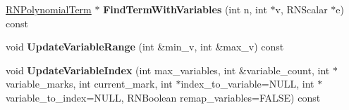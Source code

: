 \begin{DoxyCompactItemize}
\item 
\hyperlink{class_r_n_polynomial_term}{R\+N\+Polynomial\+Term} $\ast$ {\bfseries Find\+Term\+With\+Variables} (int n, int $\ast$v, R\+N\+Scalar $\ast$e) const \hypertarget{class_r_n_polynomial_ab54b0c8ee80c040a4acfb7a6e0633d56}{}\label{class_r_n_polynomial_ab54b0c8ee80c040a4acfb7a6e0633d56}

\item 
void {\bfseries Update\+Variable\+Range} (int \&min\+\_\+v, int \&max\+\_\+v) const \hypertarget{class_r_n_polynomial_a0310a8410886d83fc07b19804a836b03}{}\label{class_r_n_polynomial_a0310a8410886d83fc07b19804a836b03}

\item 
void {\bfseries Update\+Variable\+Index} (int max\+\_\+variables, int \&variable\+\_\+count, int $\ast$variable\+\_\+marks, int current\+\_\+mark, int $\ast$index\+\_\+to\+\_\+variable=N\+U\+LL, int $\ast$variable\+\_\+to\+\_\+index=N\+U\+LL, R\+N\+Boolean remap\+\_\+variables=F\+A\+L\+SE) const \hypertarget{class_r_n_polynomial_a89ce79764086298fe4191fa591929d0f}{}\label{class_r_n_polynomial_a89ce79764086298fe4191fa591929d0f}

\end{DoxyCompactItemize}
